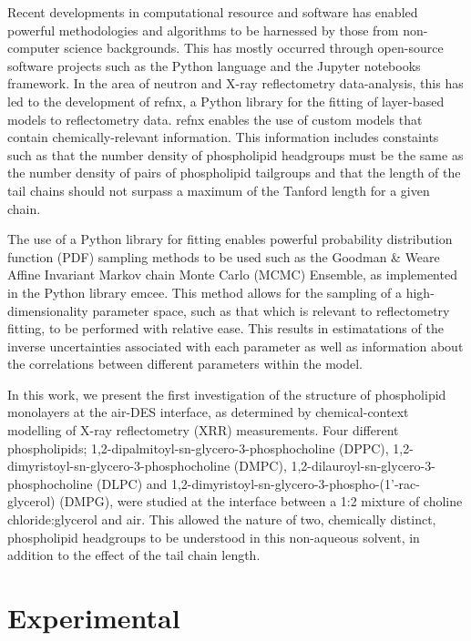 \documentclass[twoside,twocolumn,9pt]{article}
\begin{document}
Recent developments in computational resource and software has enabled powerful methodologies and algorithms to be harnessed by those from non-computer science backgrounds. This has mostly occurred through open-source software projects such as the Python language and the Jupyter notebooks framework.\cite{vanRossum1995,Kluyver2016} In the area of neutron and X-ray reflectometry data-analysis, this has led to the development of refnx,\cite{Nelson2018} a Python library for the fitting of layer-based models to reflectometry data. refnx enables the use of custom models that contain chemically-relevant information. This information includes constaints such as that the number density of phospholipid headgroups must be the same as the number density of pairs of phospholipid tailgroups and that the length of the tail chains should not surpass a maximum of the Tanford length for a given chain.\cite{Tanford1980}

The use of a Python library for fitting enables powerful probability distribution function (PDF) sampling methods to be used such as the Goodman \& Weare Affine Invariant Markov chain Monte Carlo (MCMC) Ensemble,\cite{Goodman2010} as implemented in the Python library emcee.\cite{Foreman-Mackey2013} This method allows for the sampling of a high-dimensionality parameter space, such as that which is relevant to reflectometry fitting, to be performed with relative ease. This results in estimatations of the inverse uncertainties associated with each parameter as well as information about the correlations between different parameters within the model. 

In this work, we present the first investigation of the structure of phospholipid monolayers at the air-DES interface, as determined by chemical-context modelling of X-ray reflectometry (XRR) measurements. Four different phospholipids; 1,2-dipalmitoyl-sn-glycero-3-phosphocholine (DPPC), 1,2-dimyristoyl-sn-glycero-3-phosphocholine (DMPC),  1,2-dilauroyl-sn-glycero-3-phosphocholine (DLPC) and 1,2-dimyristoyl-sn-glycero-3-phospho-(1'-rac-glycerol) (DMPG), were studied at the interface between a 1:2 mixture of choline chloride:glycerol and air. This allowed the nature of two, chemically distinct, phospholipid headgroups to be understood in this non-aqueous solvent, in addition to the effect of the tail chain length. 

\section{Experimental}
\end{document}
